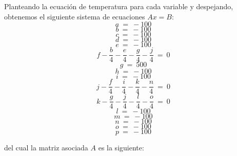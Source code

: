 Planteando la ecuación de temperatura para cada variable y despejando, obtenemos el siguiente sistema de ecuaciones $Ax=B$:
\begin{equation}
 a\ =\ -100
\end{equation}
\begin{equation}
 b\ =\ -100
\end{equation}
\begin{equation}
 c\ =\ -100
\end{equation}
\begin{equation}
 d\ =\ -100
\end{equation}
\begin{equation}
 e\ =\ -100
\end{equation}
\begin{equation}
 f - \frac{b}{4} - \frac{e}{4} - \frac{g}{4} - \frac{j}{4}\ =\ 0
\end{equation}
\begin{equation}
 g\ =\ 500
\end{equation}
\begin{equation}
 h\ =\ -100
\end{equation}
\begin{equation}
 i\ =\ -100
\end{equation}
\begin{equation}
 j- \frac{f}{4} - \frac{i}{4} - \frac{k}{4} - \frac{n}{4}\ =\ 0
\end{equation}
\begin{equation}
 k- \frac{g}{4} - \frac{j}{4} - \frac{l}{4} - \frac{o}{4}\ =\ 0
\end{equation}
\begin{equation}
 l\ =\ -100
\end{equation}
\begin{equation}
 m\ =\ -100
\end{equation}
\begin{equation}
 n\ =\ -100
\end{equation}
\begin{equation}
 o\ =\ -100
\end{equation}
\begin{equation}
 p\ =\ -100
\end{equation}

 del cual la matriz asociada $A$ es la siguiente:
 
